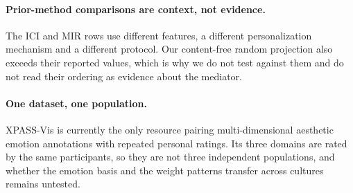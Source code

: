 \paragraph{Prior-method comparisons are context, not evidence.}
The ICI and MIR rows use different features, a different personalization
mechanism and a different protocol. Our content-free random projection also
exceeds their reported values, which is why we do not test against them and do
not read their ordering as evidence about the mediator.

\paragraph{One dataset, one population.}
XPASS-Vis is currently the only resource pairing multi-dimensional aesthetic
emotion annotations with repeated personal ratings. Its three domains are rated
by the same participants, so they are not three independent populations, and
whether the emotion basis and the weight patterns transfer across cultures
remains untested.
